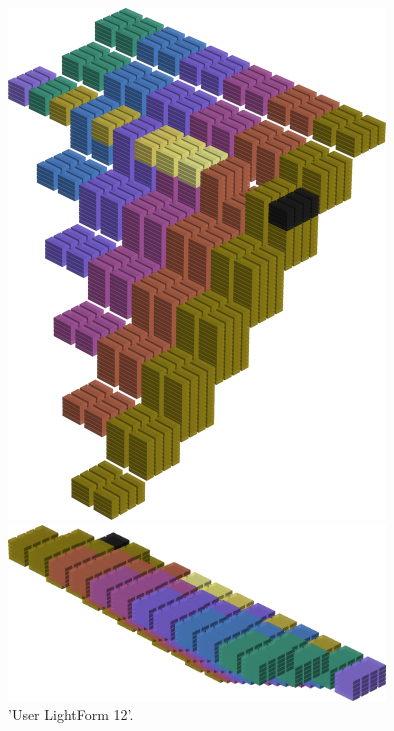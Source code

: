 %
%
\begin{minipage}[b]{0.48\linewidth}
\begin{figure}[H]
    \centering
    \begin{adjustbox}{width=4cm,margin=0cm 0cm}
      \includegraphics[width=10cm]{src/colorspace_patterns/pattern20-45.png}%
    \end{adjustbox}
    \begin{adjustbox}{width=4cm,margin=0cm 0cm}
      \includegraphics[width=10cm]{src/colorspace_patterns/pattern20-225.png}%
    \end{adjustbox}
\caption{'User LightForm 12'.}
\end{figure}
\end{minipage}
